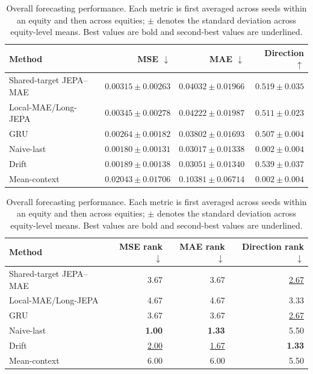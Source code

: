 \begin{table}[t]
\centering
\small
\caption{Overall forecasting performance. Each metric is first averaged across seeds within an equity and then across equities; $\pm$ denotes the standard deviation across equity-level means. Best values are bold and second-best values are underlined.}
\label{tab:main_metrics}
\begin{tabular}{lrrr}
\toprule
Method & MSE $\downarrow$ & MAE $\downarrow$ & Direction $\uparrow$ \\
\midrule
Shared-target JEPA--MAE & $0.00315 \pm 0.00263$ & $0.04032 \pm 0.01966$ & \underline{$0.519 \pm 0.035$} \\
Local-MAE/Long-JEPA & $0.00345 \pm 0.00278$ & $0.04222 \pm 0.01987$ & $0.511 \pm 0.023$ \\
GRU & $0.00264 \pm 0.00182$ & $0.03802 \pm 0.01693$ & $0.507 \pm 0.004$ \\
Naive-last & \textbf{$0.00180 \pm 0.00131$} & \textbf{$0.03017 \pm 0.01338$} & $0.002 \pm 0.004$ \\
Drift & \underline{$0.00189 \pm 0.00138$} & \underline{$0.03051 \pm 0.01340$} & \textbf{$0.539 \pm 0.037$} \\
Mean-context & $0.02043 \pm 0.01706$ & $0.10381 \pm 0.06714$ & $0.002 \pm 0.004$ \\
\bottomrule
\end{tabular}
\par\medskip
\begin{tabular}{lrrr}
\toprule
Method & MSE rank $\downarrow$ & MAE rank $\downarrow$ & Direction rank $\downarrow$ \\
\midrule
Shared-target JEPA--MAE & 3.67 & 3.67 & \underline{2.67} \\
Local-MAE/Long-JEPA & 4.67 & 4.67 & 3.33 \\
GRU & 3.67 & 3.67 & \underline{2.67} \\
Naive-last & \textbf{1.00} & \textbf{1.33} & 5.50 \\
Drift & \underline{2.00} & \underline{1.67} & \textbf{1.33} \\
Mean-context & 6.00 & 6.00 & 5.50 \\
\bottomrule
\end{tabular}
\end{table}
